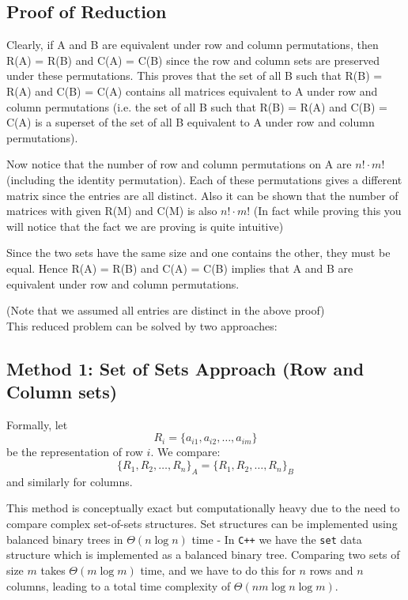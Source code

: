\documentclass[11pt,openany]{book}
\begin{document}
\subsection*{Proof of Reduction}
Clearly, if A and B are equivalent under row and column permutations, then R(A) = R(B) and C(A) = C(B) 
since the row and column sets are preserved under these permutations. This proves that the set of all B such that R(B) = R(A) and C(B) = C(A)
contains all matrices equivalent to A under row and column permutations (i.e. the set of all B such that 
R(B) = R(A) and C(B) = C(A) is a superset of the set of all B equivalent to A under row and column permutations).

Now notice that the number of row and column permutations on A are $n!\cdot m!$ (including the identity permutation). 
Each of these permutations gives a different matrix since the entries are all distinct.
Also it can be shown that the number of matrices with given R(M) and C(M) is also $n!\cdot m!$ (In fact while proving 
this you will notice that the fact we are proving is quite intuitive)  

Since the two sets have the same size and one contains the other, they must be equal. 
Hence R(A) = R(B) and C(A) = C(B) implies that A and B are equivalent under row and column permutations.

(Note that we assumed all entries are distinct in the above proof)\\

This reduced problem can be solved by two approaches:
\subsection[Deterministic Method]{Method 1: Set of Sets Approach (Row and Column sets)}

Formally, let
\[
R_i = \{a_{i1}, a_{i2}, \dots, a_{im}\}
\]
be the representation of row \(i\). We compare:
\[
\{R_1, R_2, \dots, R_n\}_A = \{R_1, R_2, \dots, R_n\}_B
\]
and similarly for columns.

This method is conceptually exact but computationally heavy due to the need to compare complex set-of-sets structures.
Set structures can be implemented using balanced binary trees in $\Theta(n\log n)$ time - In \texttt{C++} we have the \texttt{set} data structure which is implemented as a balanced binary tree. 
Comparing two sets of size \(m\) takes \(\Theta(m\log m)\) time, and we have to do this for \(n\) rows and \(n\) columns, leading to a total time complexity of \(\Theta(nm\log n\log m)\). \\
\end{document}
